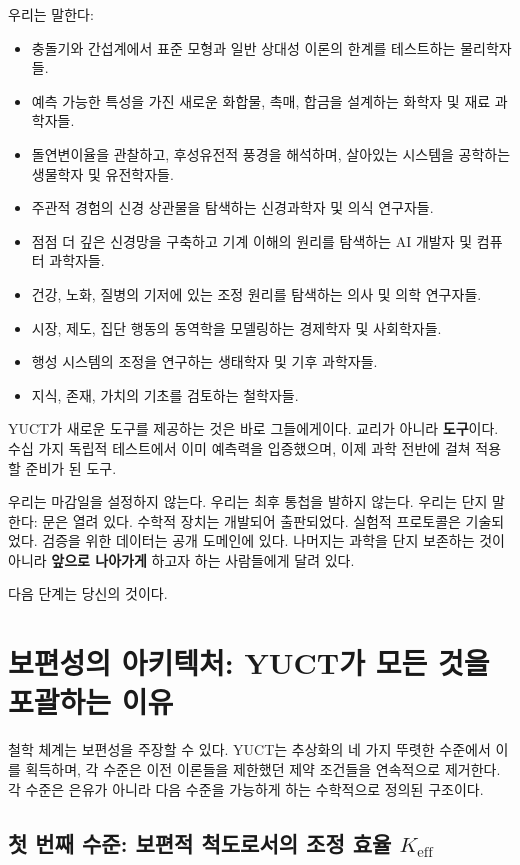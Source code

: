 \documentclass[12pt,a4paper]{article}
\begin{document}
	우리는 말한다:
	\begin{itemize}
		\item 충돌기와 간섭계에서 표준 모형과 일반 상대성 이론의 한계를 테스트하는 물리학자들.
		\item 예측 가능한 특성을 가진 새로운 화합물, 촉매, 합금을 설계하는 화학자 및 재료 과학자들.
		\item 돌연변이율을 관찰하고, 후성유전적 풍경을 해석하며, 살아있는 시스템을 공학하는 생물학자 및 유전학자들.
		\item 주관적 경험의 신경 상관물을 탐색하는 신경과학자 및 의식 연구자들.
		\item 점점 더 깊은 신경망을 구축하고 기계 이해의 원리를 탐색하는 AI 개발자 및 컴퓨터 과학자들.
		\item 건강, 노화, 질병의 기저에 있는 조정 원리를 탐색하는 의사 및 의학 연구자들.
		\item 시장, 제도, 집단 행동의 동역학을 모델링하는 경제학자 및 사회학자들.
		\item 행성 시스템의 조정을 연구하는 생태학자 및 기후 과학자들.
		\item 지식, 존재, 가치의 기초를 검토하는 철학자들.
	\end{itemize}
	
	YUCT가 새로운 도구를 제공하는 것은 바로 그들에게이다. 교리가 아니라 \textbf{도구}이다. 수십 가지 독립적 테스트에서 이미 예측력을 입증했으며, 이제 과학 전반에 걸쳐 적용할 준비가 된 도구.
	
	우리는 마감일을 설정하지 않는다. 우리는 최후 통첩을 발하지 않는다. 우리는 단지 말한다: 문은 열려 있다. 수학적 장치는 개발되어 출판되었다. 실험적 프로토콜은 기술되었다. 검증을 위한 데이터는 공개 도메인에 있다. 나머지는 과학을 단지 보존하는 것이 아니라 \textbf{앞으로 나아가게} 하고자 하는 사람들에게 달려 있다.
	
	다음 단계는 당신의 것이다.
	
	\section{보편성의 아키텍처: YUCT가 모든 것을 포괄하는 이유}
	\label{sec:architecture-of-universality}
	
	철학 체계는 보편성을 주장할 수 있다. YUCT는 추상화의 네 가지 뚜렷한 수준에서 이를 획득하며, 각 수준은 이전 이론들을 제한했던 제약 조건들을 연속적으로 제거한다. 각 수준은 은유가 아니라 다음 수준을 가능하게 하는 수학적으로 정의된 구조이다.
	
	\subsection{첫 번째 수준: 보편적 척도로서의 조정 효율 \(K_{\mathrm{eff}}\)}
	
\end{document}
